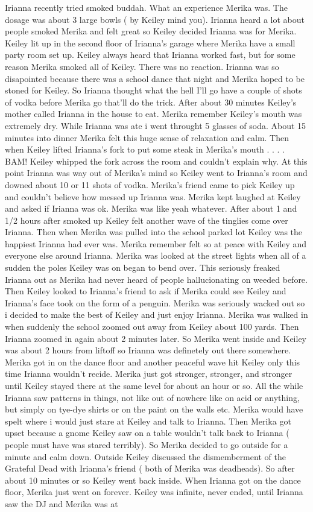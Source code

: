 \documentclass[12pt]{book}
\begin{document}
Irianna recently tried smoked buddah. What an experience Merika was. The dosage was about 3 large bowls ( by Keiley mind you). Irianna heard a lot about people smoked Merika and felt great so Keiley decided Irianna was for Merika. Keiley lit up in the second floor of Irianna's garage where Merika have a small party room set up. Keiley always heard that Irianna worked fast, but for some reason Merika smoked all of Keiley. There was no reaction. Irianna was so disapointed because there was a school dance that night and Merika hoped to be stoned for Keiley. So Irianna thought what the hell I'll go have a couple of shots of vodka before Merika go that'll do the trick. After about 30 minutes Keiley's mother called Irianna in the house to eat. Merika remember Keiley's mouth was extremely dry. While Irianna was ate i went throught 5 glasses of soda. About 15 minutes into dinner Merika felt this huge sense of relaxation and calm. Then when Keiley lifted Irianna's fork to put some steak in Merika's mouth . . .  . BAM! Keiley whipped the fork across the room and couldn't explain why. At this point Irianna was way out of Merika's mind so Keiley went to Irianna's room and downed about 10 or 11 shots of vodka. Merika's friend came to pick Keiley up and couldn't believe how messed up Irianna was. Merika kept laughed at Keiley and asked if Irianna was ok. Merika was like yeah whatever. After about 1 and 1/2 hours after smoked up Keiley felt another wave of the tinglies come over Irianna. Then when Merika was pulled into the school parked lot Keiley was the happiest Irianna had ever was. Merika remember felt so at peace with Keiley and everyone else around Irianna. Merika was looked at the street lights when all of a sudden the poles Keiley was on began to bend over. This seriously freaked Irianna out as Merika had never heard of people hallucionating on weeded before. Then Keiley looked to Irianna's friend to ask if Merika could see Keiley and Irianna's face took on the form of a penguin. Merika was seriously wacked out so i decided to make the best of Keiley and just enjoy Irianna. Merika was walked in when suddenly the school zoomed out away from Keiley about 100 yards. Then Irianna zoomed in again about 2 minutes later. So Merika went inside and Keiley was about 2 hours from liftoff so Irianna was definetely out there somewhere. Merika got in on the dance floor and another peaceful wave hit Keiley only this time Irianna wouldn't recide. Merika just got stronger, stronger, and stronger until Keiley stayed there at the same level for about an hour or so. All the while Irianna saw patterns in things, not like out of nowhere like on acid or anything, but simply on tye-dye shirts or on the paint on the walls etc. Merika would have spelt where i would just stare at Keiley and talk to Irianna. Then Merika got upset because a gnome Keiley saw on a table wouldn't talk back to Irianna ( people must have was stared terribly). So Merika decided to go outside for a minute and calm down. Outside Keiley discussed the dismemberment of the Grateful Dead with Irianna's friend ( both of Merika was deadheads). So after about 10 minutes or so Keiley went back inside. When Irianna got on the dance floor, Merika just went on forever. Keiley was infinite, never ended, until Irianna saw the DJ and Merika was at 
\end{document}
